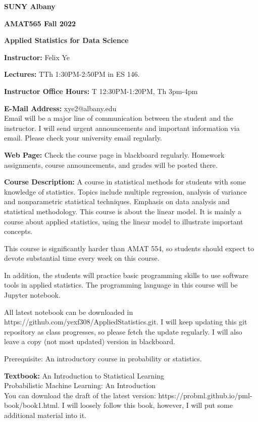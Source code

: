 \documentclass[a4paper,10pt]{article}
\begin{document}
\begin{center}

\textbf{SUNY Albany}

\textbf{AMAT565 Fall 2022}

\textbf{Applied Statistics for Data Science}


\end{center}

\textbf{Instructor:} Felix Ye 

\textbf{Lectures:} TTh 1:30PM-2:50PM  in ES 146.

\textbf{Instructor Office Hours:}  T 12:30PM-1:20PM, Th 3pm-4pm


\textbf{E-Mail Address:} xye2@albany.edu\\
Email will be a major line of communication between the student and the instructor. I will send urgent announcements and important information via email. Please check your university email regularly.

\textbf{Web Page:}
Check the course page in blackboard regularly. Homework assignments, course announcements, and grades will be posted there.


\textbf{Course Description:} 	
A course in statistical methods for students with some knowledge of statistics. Topics include multiple regression, analysis of variance and nonparametric statistical techniques. Emphasis on data analysis and statistical methodology.  
This course is about the linear model. It is mainly a course about applied statistics, using the linear model to illustrate important concepts.

This course is significantly harder than AMAT 554, so students should expect to devote substantial time every week on this course. 

In addition, the students will practice basic programming skills to use software tools in applied statistics. The programming language in this course will be Jupyter notebook. 

All latest notebook can be downloaded in https://github.com/yexf308/AppliedStatistics.git. I will keep updating this git repository as class progresses, so please fetch the update regularly. I will also leave a copy (not most updated) version in blackboard. 

 Prerequisite: An introductory course in probability or statistics.  
 

\textbf{Textbook:} 
An Introduction to Statistical Learning \\
Probabilistic Machine Learning: An Introduction \\
You can download the draft of the latest version: https://probml.github.io/pml-book/book1.html. 
 I will loosely follow this book, however, I will put some additional material into it. 
\end{document}
